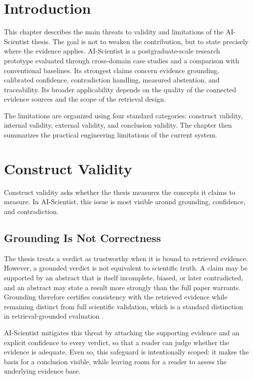 \section{Introduction }

This chapter describes the main threats to validity and limitations of the AI-Scientist thesis. The goal is not to
weaken the contribution, but to state precisely where the evidence applies. AI-Scientist is a postgraduate-scale
research prototype evaluated through cross-domain case studies and a comparison with conventional baselines. Its
strongest claims concern evidence grounding, calibrated confidence, contradiction handling, measured abstention,
and traceability. Its broader applicability depends on the quality of the connected evidence sources and the scope
of the retrieval design.

The limitations are organized using four standard categories: construct validity, internal validity, external
validity, and conclusion validity. The chapter then summarizes the practical engineering limitations of the current
system.

\section{Construct Validity }

Construct validity asks whether the thesis measures the concepts it claims to measure. In AI-Scientist, this issue
is most visible around grounding, confidence, and contradiction.

\subsection{Grounding Is Not Correctness }

The thesis treats a verdict as trustworthy when it is bound to retrieved evidence. However, a grounded verdict is
not equivalent to scientific truth. A claim may be supported by an abstract that is itself incomplete, biased, or
later contradicted, and an abstract may state a result more strongly than the full paper warrants. Grounding
therefore certifies consistency with the retrieved evidence while remaining distinct from full scientific
validation, which is a standard distinction in retrieval-grounded evaluation \cite{petroni2020kilt,thakur2021beir,es2023ragas}.

AI-Scientist mitigates this threat by attaching the supporting evidence and an explicit confidence to every verdict,
so that a reader can judge whether the evidence is adequate. Even so, this safeguard is intentionally scoped: it
makes the basis for a conclusion visible, while leaving room for a reader to assess the underlying evidence base.

